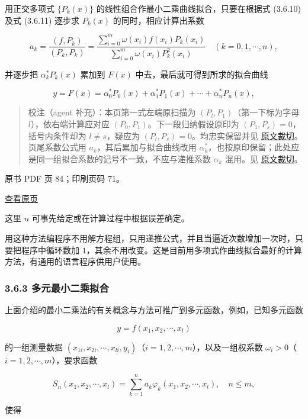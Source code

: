 用正交多项式 \(\{P_k(x)\}\) 的线性组合作最小二乘曲线拟合，只要在根据式 (3.6.10) 及式 (3.6.11) 逐步求 \(P_k(x)\) 的同时，相应计算出系数

\[
a_k=\frac{(f,P_k)}{(P_k,P_k)}=\frac{\displaystyle\sum_{i=0}^m\omega(x_i)f(x_i)P_k(x_i)}{\displaystyle\sum_{i=0}^m\omega(x_i)P_k^2(x_i)}\quad(k=0,1,\cdots,n),
\]

并逐步把 \(\alpha_k^*P_k(x)\) 累加到 \(F(x)\) 中去，最后就可得到所求的拟合曲线

\[
y=F(x)=\alpha_0^*P_0(x)+\alpha_1^*P_1(x)+\cdots+\alpha_n^*P_n(x),
\]

\begin{quote}
校注（agent 补充）：本页第一式左端原扫描为 \((P_l,P_1)\)（第一下标为字母 \(l\)），依右端计算应对应 \((P_0,P_1)\)。下一段归纳假设原印为 \((P_1,P_s)=0\)，括号内条件却为 \(l\ne s\)，疑应为 \((P_l,P_s)=0\)。均忠实保留并见 \href{verified/assets/ch03b/p083-induction-start.png}{原文裁切}。页尾系数公式用 \(a_k\)，其后累加与拟合曲线改用 \(\alpha_k^*\)，也按原印保留；此处应是同一组拟合系数的记号不一致，不应与递推系数 \(\alpha_k\) 混用。见 \href{verified/assets/ch03b/p083-fit-coefficients.png}{原文裁切}。
\end{quote}

\clearpage

原书 PDF 页 84；印刷页码 71。

\href{source-images/pdf-084.jpeg}{查看原页}

这里 \(n\) 可事先给定或在计算过程中根据误差确定。

用这种方法编程序不用解方程组，只用递推公式，并且当逼近次数增加一次时，只要把程序中循环数加 \(1\)，其余不用改变。这是目前用多项式作曲线拟合最好的计算方法，有通用的语言程序供用户使用。

\subsubsection{3.6.3 多元最小二乘拟合}\label{ch03b-ux591aux5143ux6700ux5c0fux4e8cux4e58ux62dfux5408}

上面介绍的最小二乘法的有关概念与方法可推广到多元函数，例如，已知多元函数

\[
y=f(x_1,x_2,\cdots,x_l)
\]

的一组测量数据 \((x_{1i},x_{2i},\cdots,x_{li},y_i)\)（\(i=1,2,\cdots,m\)），以及一组权系数 \(\omega_i>0\)（\(i=1,2,\cdots,m\)），要求函数

\[
S_n(x_1,x_2,\cdots,x_l)=\sum_{k=1}^na_k\varphi_k(x_1,x_2,\cdots,x_l),\quad n\leqslant m,
\]

使得

